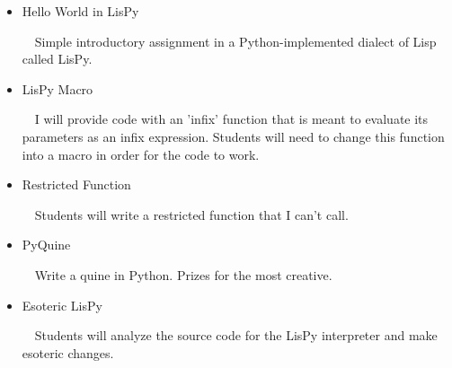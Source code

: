\documentclass[11pt]{article}
\begin{document}
\begin{itemize}
\item Hello World in LisPy

$\ \ \ $ Simple introductory assignment in a Python-implemented dialect of Lisp called LisPy.

\item LisPy Macro

$\ \ \ $ I will provide code with an 'infix' function that is meant to evaluate its parameters as an infix expression. Students will need to change this function into a macro in order for the code to work.

\item Restricted Function

$\ \ \ $ Students will write a restricted function that I can't call.

\item PyQuine

$\ \ \ $ Write a quine in Python. Prizes for the most creative.

\item Esoteric LisPy

$\ \ \ $ Students will analyze the source code for the LisPy interpreter and make esoteric changes.

\end{itemize}
\end{document}

